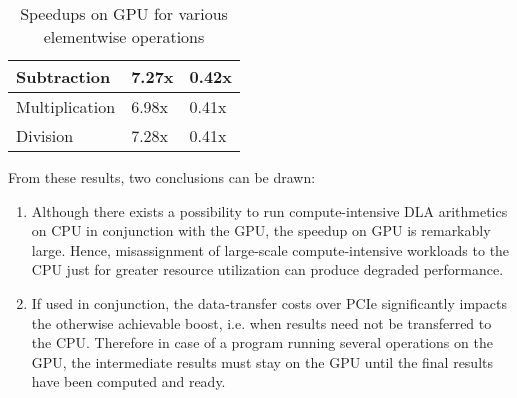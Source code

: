 \documentclass[thesis.tex]{subfiles}
\begin{document}
{\begin{table}[H]
\begin{tabular}{|l|l|l|}
		Subtraction                                                                                                             & {\color[HTML]{036400} 7.27x}                                                                                      & {\color[HTML]{CB0000} 0.42x}                                                                                   \\ \hline
		Multiplication                                                                                                          & {\color[HTML]{036400} 6.98x}                                                                                      & {\color[HTML]{CB0000} 0.41x}                                                                                   \\ \hline
		Division                                                                                                                & {\color[HTML]{036400} 7.28x}                                                                                      & {\color[HTML]{CB0000} 0.41x}                                                                                   \\ \hline
	\end{tabular}
	\caption{Speedups on GPU for various elementwise operations}
	\label{table:matOpsTar}
\end{table}}

From these results, two conclusions can be drawn:
\begin{enumerate}
	\item Although there exists a possibility to run compute-intensive DLA arithmetics on CPU in conjunction with the GPU, the speedup on GPU is remarkably large. Hence, misassignment of large-scale compute-intensive workloads to the CPU just for greater resource utilization can produce degraded performance. 
	\item If used in conjunction, the data-transfer costs over PCIe significantly impacts the otherwise achievable boost, i.e. when results need not be transferred to the CPU. Therefore in case of a program running several operations on the GPU, the intermediate results must stay on the GPU until the final results have been computed and ready.
\end{enumerate}
\end{document}

